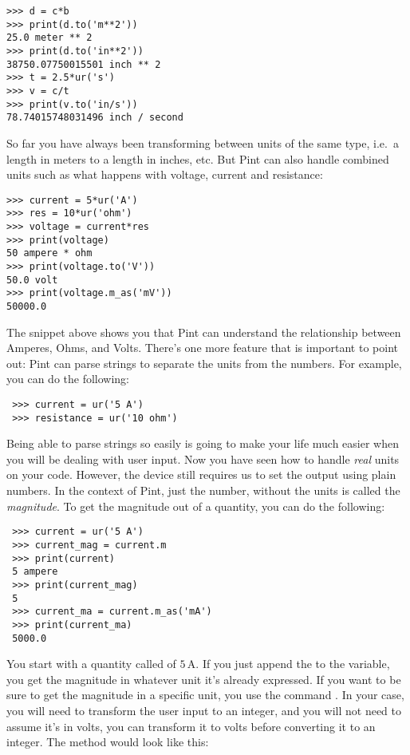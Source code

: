 \begin{verbatim}
>>> d = c*b
>>> print(d.to('m**2'))
25.0 meter ** 2
>>> print(d.to('in**2'))
38750.07750015501 inch ** 2
>>> t = 2.5*ur('s')
>>> v = c/t
>>> print(v.to('in/s'))
78.74015748031496 inch / second
\end{verbatim}

So far you have always been transforming between units of the same type, i.e.\ a length in meters to a length in inches, etc. But Pint can also handle combined units such as what happens with voltage, current and resistance:

\begin{verbatim}
>>> current = 5*ur('A')
>>> res = 10*ur('ohm')
>>> voltage = current*res
>>> print(voltage)
50 ampere * ohm
>>> print(voltage.to('V'))
50.0 volt
>>> print(voltage.m_as('mV'))
50000.0
\end{verbatim}

The snippet above shows you that Pint can understand the relationship between Amperes, Ohms, and Volts. There's one more feature that is important to point out: Pint can parse strings to separate the units from the numbers. For example, you can do the following:

\begin{verbatim}
 >>> current = ur('5 A')
 >>> resistance = ur('10 ohm')
\end{verbatim}

Being able to parse strings so easily is going to make your life much easier when you will be dealing with user input. Now you have seen how to handle \emph{real} units on your code. However, the device still requires us to set the output using plain numbers. In the context of Pint, just the number, without the units is called the \emph{magnitude}. To get the magnitude out of a quantity, you can do the following:

\begin{verbatim}
 >>> current = ur('5 A')
 >>> current_mag = current.m
 >>> print(current)
 5 ampere
 >>> print(current_mag)
 5
 >>> current_ma = current.m_as('mA')
 >>> print(current_ma)
 5000.0
\end{verbatim}

You start with a quantity called  of $5\,\textrm{A}$. If you just append the  to the variable, you get the magnitude in whatever unit it's already expressed. If you want to be sure to get the magnitude in a specific unit, you use the command . In your case, you will need to transform the user input to an integer, and you will not need to assume it's in volts, you can transform it to volts before converting it to an integer. The  method would look like this:

